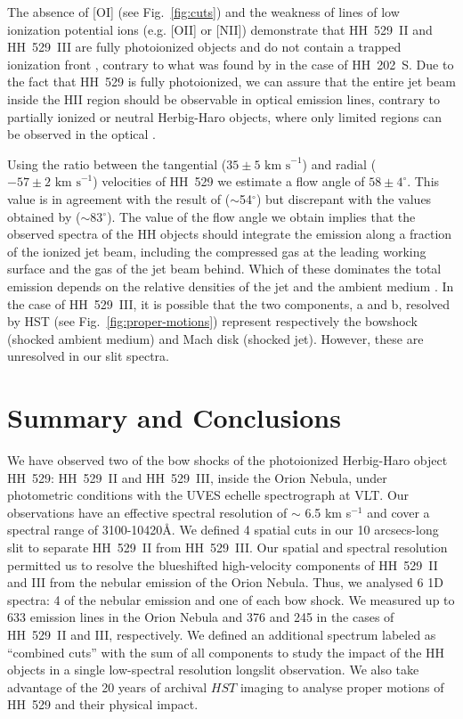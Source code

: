 \documentclass[fleqn,usenatbib]{mnras}
\begin{document}
The absence of [O\thinspace I] (see Fig.~\ref{fig:cuts}) and the weakness of lines of low ionization potential ions (e.g. [O\thinspace II] or [N\thinspace II]) demonstrate  that HH~529~II and HH~529~III are fully photoionized objects and do not contain a trapped ionization front \citep{Masciadriyraga01}, contrary to what was found by \citet{mesadelgado09} in the case of HH~202~S. Due to the fact that HH~529 is fully photoionized, we can assure that the entire jet beam inside the H\thinspace II region should be  observable in optical emission lines, contrary to partially ionized or neutral Herbig-Haro objects, where only limited regions can be observed in the optical \citep{raga00_proc,raga00_mnras}.

Using the ratio between the tangential ($35 \pm 5 \text{ km s}^{-1}$) and radial ($-57 \pm 2 \text{ km s}^{-1}$) velocities of HH~529 we estimate a flow angle of $58 \pm 4^\circ$. This value is in agreement with the result of \citet{odellyhenney08} ($\sim$54$^\circ$) but discrepant with the values obtained by \citet{Odell15} ($\sim$83$^\circ$). The value of the flow angle we obtain  implies that the observed spectra of the HH objects should integrate the emission along a fraction of the ionized jet beam, including the compressed gas at the leading working surface and the gas of the jet beam behind. Which of these dominates the total emission depends on the relative densities of the jet and the ambient medium \citep{Hartigan89}. In the case of HH~529~III, it is possible that the two components, a and b, resolved by HST (see Fig.~\ref{fig:proper-motions}) represent respectively the bowshock (shocked ambient medium) and Mach disk (shocked jet). However, these are unresolved in our slit spectra.



\section{Summary and Conclusions}
\label{sec:summary}

We have observed two of the bow shocks of the photoionized Herbig-Haro object HH~529: HH~529~II and HH~529~III, inside the Orion Nebula, under photometric conditions with the UVES echelle spectrograph at VLT. Our observations have an effective spectral resolution of $\sim$ 6.5 km s$^{-1}$ and cover a spectral range of 3100-10420\AA. We defined 4 spatial cuts in our 10 arcsecs-long slit to separate HH~529~II from HH~529~III. Our spatial and spectral resolution permitted us to resolve the blueshifted high-velocity components of HH~529~II and III from the nebular emission of the Orion Nebula. Thus, we analysed 6 1D spectra: 4 of the nebular emission and one of each bow shock. We measured up to 633 emission lines in the Orion Nebula and 376 and 245 in the cases of HH~529~II and III, respectively. We defined an additional spectrum labeled as ``combined cuts'' with the sum of all components to study the impact of the HH objects in a single low-spectral resolution longslit observation. We also take advantage of the 20 years of archival $HST$ imaging to analyse proper motions of HH~529 and their physical impact. 
\end{document}
